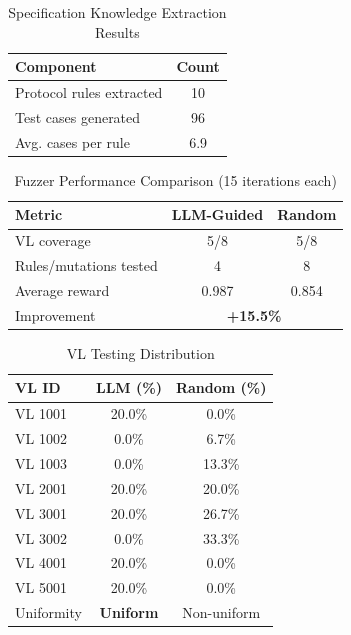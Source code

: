 
\begin{table}[ht]
\centering
\caption{Specification Knowledge Extraction Results}
\label{tab:phase1}
\small
\begin{tabular}{lc}
\toprule
\textbf{Component} & \textbf{Count} \\
\midrule
Protocol rules extracted & 10 \\
Test cases generated & 96 \\
Avg. cases per rule & 6.9 \\
\bottomrule
\end{tabular}
\end{table}

\begin{table}[ht]
\centering
\caption{Fuzzer Performance Comparison (15 iterations each)}
\label{tab:fuzzer-comparison}
\small
\begin{tabular}{lcc}
\toprule
\textbf{Metric} & \textbf{LLM-Guided} & \textbf{Random} \\
\midrule
VL coverage & 5/8 & 5/8 \\
Rules/mutations tested & 4 & 8 \\
Average reward & 0.987 & 0.854 \\
Improvement & \multicolumn{2}{c}{\textbf{+15.5\%}} \\
\bottomrule
\end{tabular}
\end{table}

\begin{table}[ht]
\centering
\caption{VL Testing Distribution}
\label{tab:vl-distribution}
\small
\begin{tabular}{lcc}
\toprule
\textbf{VL ID} & \textbf{LLM (\%)} & \textbf{Random (\%)} \\
\midrule
VL 1001 & 20.0\% & 0.0\% \\
VL 1002 & 0.0\% & 6.7\% \\
VL 1003 & 0.0\% & 13.3\% \\
VL 2001 & 20.0\% & 20.0\% \\
VL 3001 & 20.0\% & 26.7\% \\
VL 3002 & 0.0\% & 33.3\% \\
VL 4001 & 20.0\% & 0.0\% \\
VL 5001 & 20.0\% & 0.0\% \\
\midrule
Uniformity & \textbf{Uniform} & Non-uniform \\
\bottomrule
\end{tabular}
\end{table}

